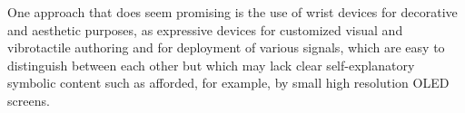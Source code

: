 \documentclass{chi-ext}
\begin{document}
One approach that does seem promising is the use of wrist devices for decorative and aesthetic purposes, as expressive devices for customized visual and vibrotactile authoring and for deployment of various signals, which are easy to distinguish between each other but which may lack clear self-explanatory symbolic content such as afforded, for example, by small high resolution OLED screens. 




\end{document}
